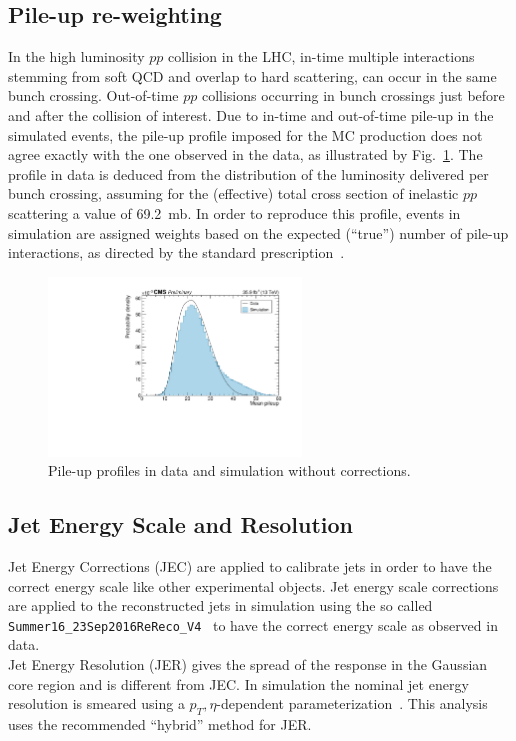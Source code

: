 \subsection{Pile-up re-weighting}\label{Subsec:PileupReweighting}
In the high luminosity $pp$ collision in the LHC, in-time multiple interactions stemming from soft QCD and overlap to hard scattering, can occur in the same bunch crossing. Out-of-time $pp$ collisions occurring in bunch crossings just before and after the collision of interest.  
Due to in-time and out-of-time pile-up in the simulated events, the pile-up profile imposed for the MC production does not agree exactly with the one observed in the data, as illustrated by Fig.~\ref{Fig:PUProfiles}.
The profile in data is deduced from the distribution of the luminosity delivered per bunch crossing, assuming for the (effective) total cross section of inelastic $pp$ scattering a value of 69.2~mb.
In order to reproduce this profile, events in simulation are assigned weights based on the expected (``true'') number of pile-up interactions, as directed by the standard prescription~\cite{Wiki:PileupReweighting, Wiki:PileupJSON}.

\begin{figure}
  \centering
  \includegraphics[width=0.6\textwidth]{fig/chapt7/correction/pileup-profiles.pdf}
  \caption{Pile-up profiles in data and simulation without corrections.}
  \label{Fig:PUProfiles}
\end{figure}


\subsection{Jet Energy Scale and Resolution}\label{sec:jes_jer}
Jet Energy Corrections (JEC) are applied to calibrate jets in order to have the correct energy scale like other experimental objects.
Jet energy scale corrections are applied to the reconstructed jets in simulation using the so called \texttt{Summer16\_23Sep2016ReReco\_V4}~\cite{wiki:jec} to have the correct energy scale as observed in data.\\
Jet Energy Resolution (JER) gives the spread of the response in the Gaussian core region and is different from JEC. In simulation the nominal jet energy resolution is smeared using a $p_{T}, \eta$-dependent parameterization~\cite{wiki:jer}. This analysis uses the recommended ``hybrid'' method for JER.


